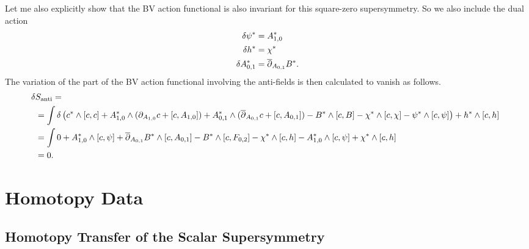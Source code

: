 \documentclass[10pt, oneside]{article}
\begin{document}
Let me also explicitly show that the BV action functional is also invariant for this square-zero supersymmetry.  So we also include the dual action
\begin{align*}
\delta \psi^* &= A_{1,0}^* \\
\delta h^* &= \chi^* \\
\delta A_{0,1}^* &= \overline{\partial}_{A_{0,1}} B^*.
\end{align*}
The variation of the part of the BV action functional involving the anti-fields is then calculated to vanish as follows.
\begin{align*}
&\!\!\! \delta S_{\mathrm{anti}} = \\
&= \int \delta \left(c^* \wedge [c, c] + {A^*_{1, 0}}\wedge (\partial_{A_{1,0}} c + [c,A_{1,0}]) + {A^*_{0, 1}}\wedge (\overline{\partial}_{A_{0,1}} c + [c, A_{0, 1}]) - B^*\wedge [c, B] - \chi^*\wedge [c, \chi] - \psi^*\wedge [c, \psi] \right) + h^* \wedge [c,h] \\
&= \int 0 +A^*_{1,0} \wedge [c,\psi] + \overline{\partial}_{A_{0,1}} B^* \wedge [c,A_{0,1}] - B^* \wedge [c,F_{0,2}] - \chi^* \wedge [c,h] - A_{1,0}^* \wedge [c,\psi] + \chi^* \wedge [c,h] \\
&= 0.
\end{align*}





\section{Homotopy Data}

\subsection{Homotopy Transfer of the Scalar Supersymmetry}



\pagestyle{bib}
\printbibliography
\end{document}
